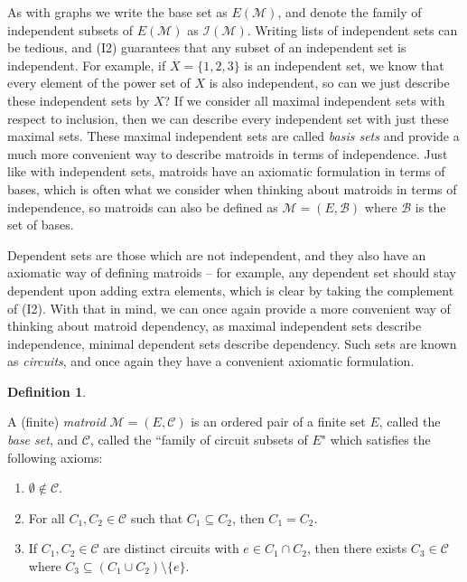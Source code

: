 \documentclass[12pt]{report}
\theoremstyle{definition}
\newtheorem{definition}[theorem]{Definition}
\def\calB{\mathcal B}
\def\calC{\mathcal C}
\def\calI{\mathcal I}
\def\calM{\mathcal M}
\theoremstyle{upright}
\begin{document}
As with graphs we write the base set as $E(\calM)$, and denote the family of independent subsets of $E(\calM)$ as $\calI(\calM)$.
Writing lists of independent sets can be tedious, and (I2) guarantees that any subset of an independent set is independent.
For example, if $X=\{1, 2, 3\}$ is an independent set, we know that every element of the power set of $X$ is also independent, so can we just describe these independent sets by $X$?
If we consider all maximal independent sets with respect to inclusion, then we can describe every independent set with just these maximal sets.
These maximal independent sets are called \textit{basis sets} and provide a much more convenient way to describe matroids in terms of independence.
Just like with independent sets, matroids have an axiomatic formulation in terms of bases, which is often what we consider when thinking about matroids in terms of independence, so matroids can also be defined as $\calM=(E, \calB)$ where $\calB$ is the set of bases.

Dependent sets are those which are not independent, and they also have an axiomatic way of defining matroids -- for example, any dependent set should stay dependent upon adding extra elements, which is clear by taking the complement of (I2).
With that in mind, we can once again provide a more convenient way of thinking about matroid dependency, as maximal independent sets describe independence, minimal dependent sets describe dependency.
Such sets are known as \textit{circuits}, and once again they have a convenient axiomatic formulation.

\begin{definition}\label{def:matroidC}

    A (finite) {\em matroid} $\calM=(E, \calC)$ is an ordered pair of a finite set $E$, called the {\em base set}, and $\calC$, called the ``family of circuit subsets of $E$" which satisfies the following axioms:
    
    \begin{enumerate}[label=(C\arabic*), leftmargin=*, align=left]

        \item $\emptyset\not\in\calC$.
        \item For all $C_1, C_2\in\calC$ such that $C_1\subseteq C_2$, then $C_1=C_2$.
        \item If $C_1, C_2\in\calC$ are distinct circuits with $e\in C_1\cap C_2$, then there exists $C_3\in\calC$ where $C_3\subseteq(C_1\cup C_2)\setminus\{e\}$.
        
    \end{enumerate}
    
\end{definition}
\end{document}
